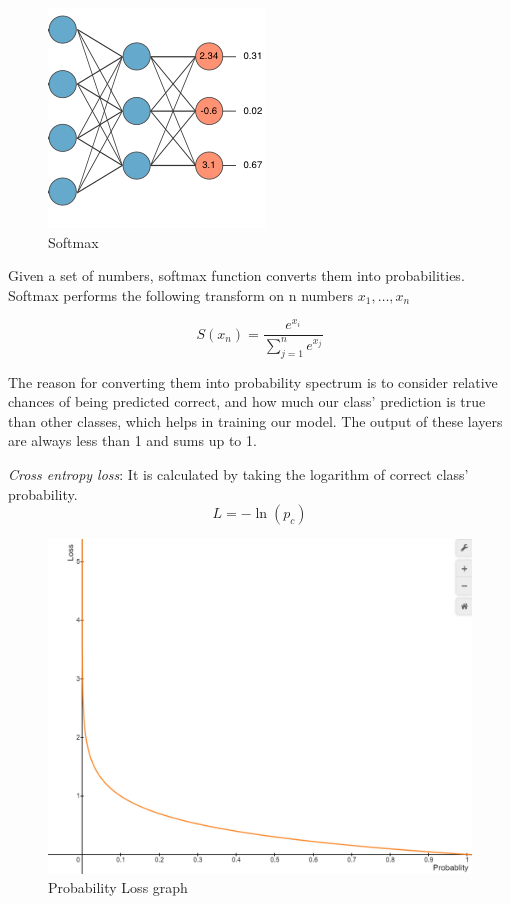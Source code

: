 \documentclass[conference]{IEEEtran}
\begin{document}
\begin{figure}[h]
  \centering
  \includegraphics[scale=0.5]{images/softmax_img.png}
  \caption{Softmax\cite{Smax_img_2020}}
  \label{fig: softmax}
\end{figure}

Given a set of numbers, softmax function converts them into probabilities.
Softmax performs the following transform on n numbers \(x_1,\ldots,x_n\)


\begin{equation}
    S(x_n)=\frac{e^{x_i}}{\sum_{j=1}^n e^{x_j}}
\end{equation}


The reason for converting them into probability spectrum is to consider relative chances of being predicted correct, and how much our class' prediction is true than other classes, which helps in training our model. 
The output of these layers are always less than 1 and sums up to 1.

\break

\emph{Cross entropy loss}:
It is calculated by taking the logarithm of correct class' probability.
\begin{equation}
    L = -\ln(p_c)
\end{equation}
\begin{figure}[h]
  \centering
  \includegraphics[scale=0.2]{images/Prob_graph.png}
  \caption{Probability Loss graph\cite{Desmos_Oct2021}}
  \label{fig:Probablity graph}
\end{figure}
\end{document}
